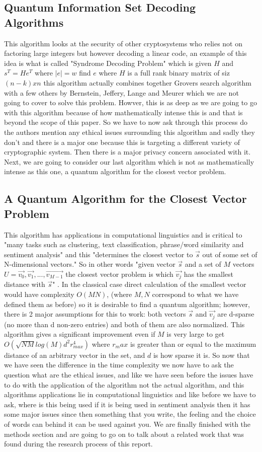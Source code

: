 \documentclass{article}
\begin{document}
\subsection{Quantum Information Set Decoding Algorithms}
This algorithm looks at the security of other cryptosystems who relies not on factoring large integers but however decoding a linear code, an example of this idea is what is called "Syndrome Decoding Problem"\cite{Kachigar} which is given $H$ and $s^T = He^T$ where $|e| = w$ find $e$ where $H$ is a full rank binary matrix of siz $(n-k) x n$ this algorithm actually combines together Grovers search algorithm with a few others by Bernstein, Jeffery, Lange and Meurer which we are not going to cover to solve this problem. Howver, this is as deep as we are going to go with this algorithm because of how mathematically intense this is and that is beyond the scope of this paper. So we have to now ask through this process do the authors mention any ethical issues surrounding this algorithm and sadly they don't and there is a major one because this is targeting a different variety of cryptographic system. Then there is a major privacy concern associated with it. Next, we are going to consider our last algorithm which is not as mathematically intense as this one, a quantum algorithm for the closest vector problem. 
\subsection{A Quantum Algorithm for the Closest Vector Problem}
This algorithm has applications in computational linguistics and is critical to "many tasks such as clustering, text classification, phrase/word similarity and sentiment analysis" and this "determines the closest vector to $\vec{s}$ out of some set of N-dimensional vectors."\cite{Zeng} So in other words "given vector $\vec{s}$ and a set of $M$ vectors $U = {\vec{v_0},\vec{v_1},...,\vec{v_{M-1}}}$ the closest vector problem is which $\vec{v_j}$ has the smallest distance with $\vec{s}$" \cite{Zeng}. In the classical case direct calculation of the smallest vector would have complexity $O(MN)$, (where $M,N$ correspond to what we have defined them as before) so it is desirable to find a quantum algorithm; however, there is 2  major assumptions for this to work: both vectors $\vec{s}$ and $\vec{v_j}$ are d-sparse (no more than d non-zero entries) and both of them are also normalized. This algorithm gives a significant improvement even if $M$ is very large to get $O(\sqrt{NM}log(M)d^2r^4_{max})$ where $r_max$ is greater than or equal to the maximum distance of an arbitrary vector in the set, and $d$ is how sparse it is. So now that we have seen the difference in the time complexity we now have to ask the question what are the ethical issues, and like we have seen before the issues have to do with the application of the algorithm not the actual algorithm, and this algorithms applications lie in computational linguistics and like before we have to ask, where is this being used if it is being used in sentiment analysis then it has some major issues since then something that you write, the feeling and the choice of words can behind it can be used against you. We are finally finished with the methods section and are going to go on to talk about a related work that was found during the research process of this report.
\end{document}
